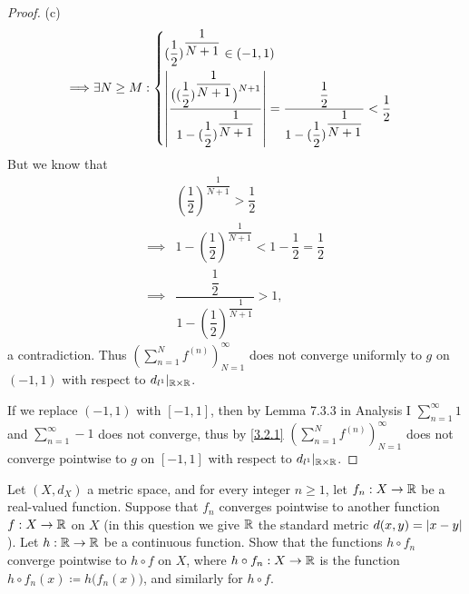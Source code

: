 \begin{proof}{(c)}
\begin{align*}
    \implies & \exists N \geq M : \begin{dcases}
                                    (\dfrac{1}{2})^{\dfrac{1}{N + 1}} \in (-1, 1) \\
                                    \left\lvert\dfrac{\big((\dfrac{1}{2})^{\dfrac{1}{N + 1}}\big)^{N + 1}}{1 - (\dfrac{1}{2})^{\dfrac{1}{N + 1}}}\right\rvert = \dfrac{\dfrac{1}{2}}{1 - (\dfrac{1}{2})^{\dfrac{1}{N + 1}}} < \dfrac{1}{2}
                                  \end{dcases}
  \end{align*}
  But we know that
  \begin{align*}
             & (\dfrac{1}{2})^{\dfrac{1}{N + 1}} > \dfrac{1}{2}                        \\
    \implies & 1 - (\dfrac{1}{2})^{\dfrac{1}{N + 1}} < 1 - \dfrac{1}{2} = \dfrac{1}{2} \\
    \implies & \dfrac{\dfrac{1}{2}}{1 - (\dfrac{1}{2})^{\dfrac{1}{N + 1}}} > 1,
  \end{align*}
  a contradiction.
  Thus \((\sum_{n = 1}^N f^{(n)})_{N = 1}^\infty\) does not converge uniformly to \(g\) on \((-1, 1)\) with respect to \(d_{l^1}|_{\mathbb{R} \times \mathbb{R}}\).

  If we replace \((-1, 1)\) with \([-1, 1]\), then by Lemma 7.3.3 in Analysis I \(\sum_{n = 1}^\infty 1\) and \(\sum_{n = 1}^\infty -1\) does not converge, thus by \cref{3.2.1} \((\sum_{n = 1}^N f^{(n)})_{N = 1}^\infty\) does not converge pointwise to \(g\) on \([-1, 1]\) with respect to \(d_{l^1}|_{\mathbb{R} \times \mathbb{R}}\).
\end{proof}

\begin{ex}\label{ex:3.2.3}
  Let \((X, d_X)\) a metric space, and for every integer \(n \geq 1\), let \(f_n : X \to \mathbb{R}\) be a real-valued function.
  Suppose that \(f_n\) converges pointwise to another function \(f : X \to \mathbb{R}\) on \(X\)
  (in this question we give \(\mathbb{R}\) the standard metric \(d(x, y) = \left\lvert x - y\right\rvert\)).
  Let \(h : \mathbb{R} \to \mathbb{R}\) be a continuous function.
  Show that the functions \(h \circ f_n\) converge pointwise to \(h \circ f\) on \(X\), where \(h \circ f_n : X \to \mathbb{R}\) is the function \(h \circ f_n(x) \coloneqq h\big(f_n(x)\big)\), and similarly for \(h \circ f\).
\end{ex}

